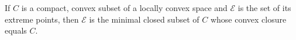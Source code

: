 If $C$ is a compact, convex subset of a locally convex space and $\mathcal{E}$ is the set of its extreme points, then $\mathcal{E}$ is the minimal closed subset of $C$ whose convex closure equals $C$.
